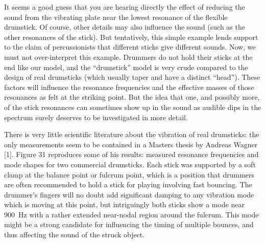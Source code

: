 


  It seems a good guess that you are hearing directly the effect of reducing 
  the sound from the vibrating plate near the lowest resonance of the flexible 
  drumstick. Of course, other details may also influence the sound (such as the 
  other resonances of the stick). But tentatively, this simple example lends 
  support to the claim of percussionists that different sticks give different 
  sounds. Now, we must not over-interpret this example. Drummers do not hold 
  their sticks at the end like our model, and the “drumstick” model is very 
  crude compared to the design of real drumsticks (which usually taper and have 
  a distinct “head”). These factors will influence the resonance frequencies 
  and the effective masses of those resonances as felt at the striking point. 
  But the idea that one, and possibly more, of the stick resonances can 
  sometimes show up in the sound as audible dips in the spectrum surely 
  deserves to be investigated in more detail. 

  There is very little scientific literature about the vibration of real 
  drumsticks: the only measurements seem to be contained in a Masters thesis by 
  Andreas Wagner [1]. Figure 31 reproduces some of his results: measured 
  resonance frequencies and mode shapes for two commercial drumsticks. Each 
  stick was supported by a soft clamp at the balance point or fulcrum point, 
  which is a position that drummers are often recommended to hold a stick for 
  playing involving fast bouncing. The drummer’s fingers will no doubt add 
  significant damping to any vibration mode which is moving at this point, but 
  intriguingly both sticks show a mode near 900~Hz with a rather extended 
  near-nodal region around the fulcrum. This mode might be a strong candidate 
  for influencing the timing of multiple bounces, and thus affecting the sound 
  of the struck object. 


